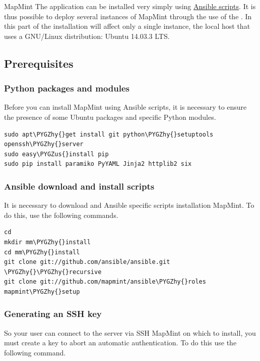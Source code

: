 \documentclass[letterpaper,10pt,english]{sphinxmanual}
\def\PYGZus{\char`\_}
\def\PYGZhy{\char`\-}
\begin{document}
MapMint The application can be installed very simply using \href{http://ansible.com}{Ansible scripts}. It is thus possible to deploy several instances of MapMint through the use of the . In this part of the installation will affect only a single instance, the local host that uses a GNU/Linux distribution: Ubuntu 14.03.3 LTS.


\subsection{Prerequisites}
\label{introduction/installmapmint:prerequis}

\subsubsection{Python packages and modules}
\label{introduction/installmapmint:paquets-et-modules-python}
Before you can install MapMint using Ansible scripts, it is necessary to ensure the presence of some Ubuntu packages and specific Python modules.

\begin{Verbatim}[commandchars=\\\{\}]
sudo apt\PYGZhy{}get install git python\PYGZhy{}setuptools openssh\PYGZhy{}server
sudo easy\PYGZus{}install pip
sudo pip install paramiko PyYAML Jinja2 httplib2 six
\end{Verbatim}


\subsubsection{Ansible download and install scripts}
\label{introduction/installmapmint:telecharger-ansible-et-les-scripts-d-installation}
It is necessary to download and Ansible specific scripts installation MapMint. To do this, use the following commands.

\begin{Verbatim}[commandchars=\\\{\}]
cd
mkdir mm\PYGZhy{}install
cd mm\PYGZhy{}install
git clone git://github.com/ansible/ansible.git \PYGZhy{}\PYGZhy{}recursive
git clone git://github.com/mapmint/ansible\PYGZhy{}roles mapmint\PYGZhy{}setup
\end{Verbatim}


\subsubsection{Generating an SSH key}
\label{introduction/installmapmint:creation-d-une-cle-ssh}
So your user can connect to the server via SSH MapMint on which to install, you must create a key to abort an automatic authentication. To do this use the following command.
\end{document}
